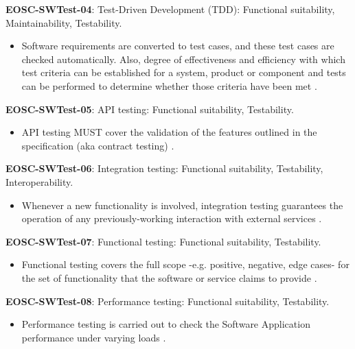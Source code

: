 \textbf{EOSC-SWTest-04}: Test-Driven Development (TDD): Functional suitability, Maintainability, Testability.

\begin{itemize}
    \item Software requirements are converted to test cases, and these test cases are checked automatically. Also, degree of effectiveness and efficiency with which test criteria can be established for a system, product or component and tests can be performed to determine whether those criteria have been met \cite{iso_25010_2011_2017,crispin_driving_2006,zuser_software_2005,orviz_set_2017}.
\end{itemize}

\textbf{EOSC-SWTest-05}: API testing: Functional suitability, Testability.

\begin{itemize}
    \item API testing MUST cover the validation of the features outlined in the specification (aka contract testing) \cite{orviz_fernandez_eosc-synergy_2020}.
\end{itemize}

\textbf{EOSC-SWTest-06}: Integration testing: Functional suitability, Testability, Interoperability.

\begin{itemize}
    \item Whenever a new functionality is involved, integration testing guarantees the operation of any previously-working interaction with external services \cite{iso_25010_2011_2017,orviz_fernandez_eosc-synergy_2020}.
\end{itemize}

\textbf{EOSC-SWTest-07}: Functional testing: Functional suitability, Testability.

\begin{itemize}
    \item Functional testing covers the full scope -e.g. positive, negative, edge cases- for the set of functionality that the software or service claims to provide \cite{iso_25010_2011_2017,orviz_fernandez_eosc-synergy_2020}.
\end{itemize}

\textbf{EOSC-SWTest-08}: Performance testing: Functional suitability, Testability.

\begin{itemize}
    \item Performance testing is carried out to check the Software Application performance under varying loads \cite{iso_25010_2011_2017,orviz_fernandez_eosc-synergy_2020}.
\end{itemize}

